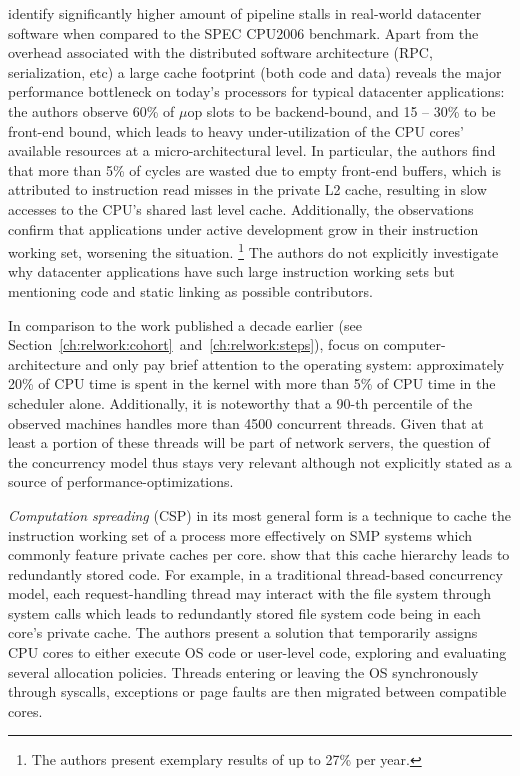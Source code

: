 \documentclass[12pt,a4paper]{book}
\begin{document}
\citeauthor*{kanev2015profiling} identify significantly higher amount of pipeline stalls in real-world datacenter software when compared to the SPEC CPU2006 benchmark.
Apart from the overhead associated with the distributed software architecture (RPC, serialization, etc) %
a large cache footprint (both code and data) reveals the major performance bottleneck on today's processors for typical datacenter applications:
the authors observe 60\% of $\mu$op slots to be backend-bound, and 15 -- 30\% to be front-end bound, which leads to heavy under-utilization of the CPU cores' available resources at a micro-architectural level.
In particular, the authors find that more than 5\% of cycles are wasted due to empty front-end buffers, which is attributed to instruction read misses in the private L2 cache, resulting in slow accesses to the CPU's shared last level cache.
Additionally, the observations confirm that applications under active development grow in their instruction working set, worsening the situation.%
\footnote{The authors present exemplary results of up to 27\% per year.}
The authors do not explicitly investigate why datacenter applications have such large instruction working sets but mentioning  code and static linking as possible contributors.

In comparison to the work published a decade earlier (see Section~\ref{ch:relwork:cohort}~and~\ref{ch:relwork:steps}),
\citeauthor*{kanev2015profiling} focus on computer-architecture and only pay brief attention to the operating system:
approximately 20\% of CPU time is spent in the kernel with more than 5\% of CPU time in the scheduler alone.
Additionally, it is noteworthy that a 90-th percentile of the observed machines handles more than 4500 concurrent threads.
Given that at least a portion of these threads will be part of network servers, the question of the concurrency model thus stays very relevant although not explicitly stated as a source of performance-optimizations.

\emph{Computation spreading} (CSP) in its most general form is a technique to cache the instruction working set of a process more effectively on SMP systems which commonly feature private caches per core.
\citeauthor*{compspr} show that this cache hierarchy leads to redundantly stored code.
For example, in a traditional thread-based concurrency model, each request-handling thread may interact with the file system through system calls which leads to redundantly stored file system code being in each core's private cache.
The authors present a solution that temporarily assigns CPU cores to either execute OS code or user-level code, exploring and evaluating several allocation policies.
Threads entering or leaving the OS synchronously through syscalls, exceptions or page faults are then migrated between compatible cores.
\end{document}
